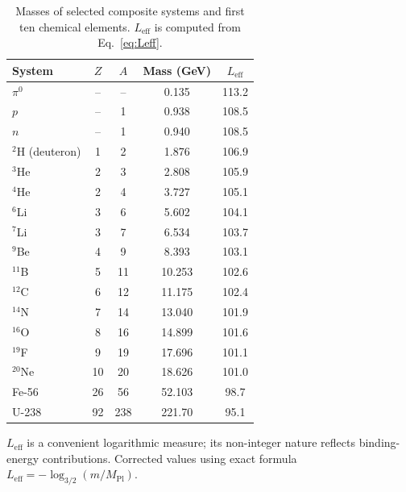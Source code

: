 \documentclass[11pt,a4paper]{article}
\begin{document}
	\begin{table}[H]
		\centering
		\caption{Masses of selected composite systems and first ten chemical elements. \(L_{\mathrm{eff}}\) is computed from Eq.~\eqref{eq:Leff}.}
		\label{tab:composite}
		\small
		\begin{tabular}{l c c c c}
			\toprule
			System & \(Z\) & \(A\) & Mass (GeV) & \(L_{\mathrm{eff}}\) \\
			\midrule
			\(\pi^0\) & – & – & 0.135 & 113.2 \\
			\(p\) & – & 1 & 0.938 & 108.5 \\
			\(n\) & – & 1 & 0.940 & 108.5 \\
			\(^2\)H (deuteron) & 1 & 2 & 1.876 & 106.9 \\
			\(^3\)He & 2 & 3 & 2.808 & 105.9 \\
			\(^4\)He & 2 & 4 & 3.727 & 105.1 \\
			\(^6\)Li & 3 & 6 & 5.602 & 104.1 \\
			\(^7\)Li & 3 & 7 & 6.534 & 103.7 \\
			\(^9\)Be & 4 & 9 & 8.393 & 103.1 \\
			\(^{11}\)B & 5 & 11 & 10.253 & 102.6 \\
			\(^{12}\)C & 6 & 12 & 11.175 & 102.4 \\
			\(^{14}\)N & 7 & 14 & 13.040 & 101.9 \\
			\(^{16}\)O & 8 & 16 & 14.899 & 101.6 \\
			\(^{19}\)F & 9 & 19 & 17.696 & 101.1 \\
			\(^{20}\)Ne & 10 & 20 & 18.626 & 101.0 \\
			Fe-56 & 26 & 56 & 52.103 & 98.7 \\
			U-238 & 92 & 238 & 221.70 & 95.1 \\
			\bottomrule
		\end{tabular}
		\par\smallskip
		\footnotesize \(L_{\mathrm{eff}}\) is a convenient logarithmic measure; its non-integer nature reflects binding-energy contributions. Corrected values using exact formula \(L_{\mathrm{eff}} = -\log_{3/2}(m/M_{\mathrm{Pl}})\).
	\end{table}
	
\end{document}
